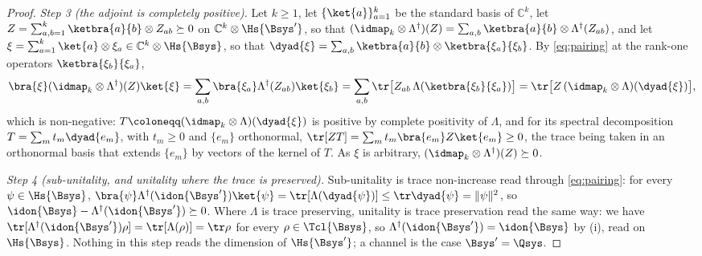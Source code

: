 \begin{proof}
\emph{Step 3 (the adjoint is completely positive).} Let $k\ge1$, let
$\{\ket{a}\}_{a=1}^{k}$ be the standard basis of $\mathbb{C}^k$, let
$Z=\sum_{a,b=1}^{k}\ketbra{a}{b}\otimes Z_{ab}\succeq0$ on
$\mathbb{C}^k\otimes\Hs{\Bsys'}$, so that
$(\idmap_k\otimes\Lambda^{\dagger})(Z)=\sum_{a,b}\ketbra{a}{b}\otimes
\Lambda^{\dagger}(Z_{ab})$, and let
$\xi=\sum_{a=1}^{k}\ket{a}\otimes\xi_a\in\mathbb{C}^k\otimes\Hs{\Bsys}$, so
that $\dyad{\xi}=\sum_{a,b}\ketbra{a}{b}\otimes\ketbra{\xi_a}{\xi_b}$. By
\eqref{eq:pairing} at the rank-one operators $\ketbra{\xi_b}{\xi_a}$,
\begin{equation*}
  \bra{\xi}(\idmap_k\otimes\Lambda^{\dagger})(Z)\ket{\xi}
  =\sum_{a,b}\bra{\xi_a}\Lambda^{\dagger}(Z_{ab})\ket{\xi_b}
  =\sum_{a,b}\tr\big[Z_{ab}\,\Lambda(\ketbra{\xi_b}{\xi_a})\big]
  =\tr\big[Z\,(\idmap_k\otimes\Lambda)(\dyad{\xi})\big],
\end{equation*}
which is non-negative: $T\coloneqq(\idmap_k\otimes\Lambda)(\dyad{\xi})$ is
positive by complete positivity of $\Lambda$, and for its spectral
decomposition $T=\sum_mt_m\dyad{e_m}$, with $t_m\ge0$ and $\{e_m\}$
orthonormal, $\tr[ZT]=\sum_mt_m\bra{e_m}Z\ket{e_m}\ge0$, the trace being taken
in an orthonormal basis that extends $\{e_m\}$ by vectors of the kernel of
$T$. As $\xi$ is arbitrary, $(\idmap_k\otimes\Lambda^{\dagger})(Z)\succeq0$.

\emph{Step 4 (sub-unitality, and unitality where the trace is preserved).}
Sub-unitality is trace non-increase read through \eqref{eq:pairing}: for
every $\psi\in\Hs{\Bsys}$,
$\bra{\psi}\Lambda^{\dagger}(\idon{\Bsys'})\ket{\psi}
=\tr[\Lambda(\dyad{\psi})]\le\tr\dyad{\psi}=\|\psi\|^2$, so
$\idon{\Bsys}-\Lambda^{\dagger}(\idon{\Bsys'})\succeq0$. Where $\Lambda$ is
trace preserving, unitality is trace preservation read the same way: we have
$\tr[\Lambda^{\dagger}(\idon{\Bsys'})\rho]=\tr[\Lambda(\rho)]=\tr\rho$ for
every $\rho\in\Tcl{\Bsys}$, so $\Lambda^{\dagger}(\idon{\Bsys'})=\idon{\Bsys}$
by (i), read on $\Hs{\Bsys}$. Nothing in this step reads the dimension of
$\Hs{\Bsys'}$; a channel is the case $\Bsys'=\Qsys$.


\end{proof}
